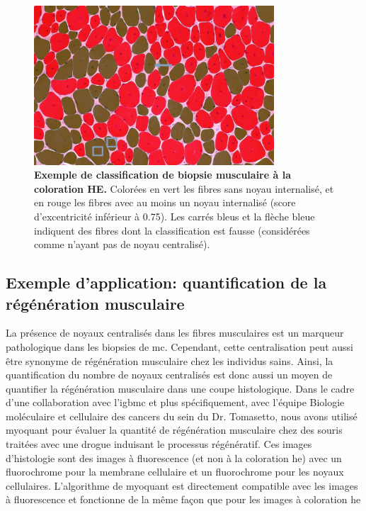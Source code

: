 \begin{figure}[htbp]
 \centering
 \includegraphics[width=0.8\textwidth]{figures/he_paint.png}
 \caption[Exemple de classification de biopsie musculaire à la coloration HE]{\textbf{Exemple de classification de biopsie musculaire à la coloration HE. }Colorées en vert les fibres sans noyau internalisé, et en rouge les fibres avec au moins un noyau internalisé (score d'excentricité inférieur à 0.75). Les carrés bleus et la flèche bleue indiquent des fibres dont la classification est fausse (considérées comme n'ayant pas de noyau centralisé).}
 \label{fig:he_paint}
\end{figure}

\subsection{Exemple d'application: quantification de la régénération musculaire }
La présence de noyaux centralisés dans les fibres musculaires est un marqueur pathologique dans les biopsies de \gls{mc}. Cependant, cette centralisation peut aussi être synonyme de régénération musculaire chez les individus sains. Ainsi, la quantification du nombre de noyaux centralisés est donc aussi un moyen de quantifier la régénération musculaire dans une coupe histologique. Dans le cadre d'une collaboration avec l'\gls{igbmc} et plus spécifiquement, avec l'équipe Biologie moléculaire et cellulaire des cancers du sein du Dr. Tomasetto, nous avons utilisé \gls{myoquant} pour évaluer la quantité de régénération musculaire chez des souris traitées avec une drogue induisant le processus régénératif. Ces images d'histologie sont des images à fluorescence (et non à la coloration \gls{he}) avec un fluorochrome pour la membrane cellulaire et un fluorochrome pour les noyaux cellulaires. L'algorithme de \gls{myoquant} est directement compatible avec les images à fluorescence et fonctionne de la même façon que pour les images à coloration \gls{he}

